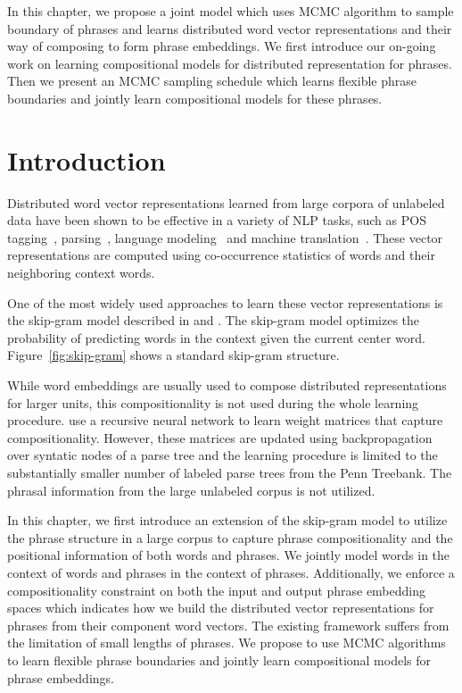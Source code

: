 In this chapter, we propose a joint model which uses MCMC algorithm to sample boundary of phrases and 
learns distributed word vector representations and their way of composing to form phrase embeddings.
We first introduce our on-going work on learning compositional models for distributed representation for phrases. Then we present an MCMC sampling schedule which learns flexible phrase  
boundaries and jointly learn compositional models for these phrases.
\section{Introduction}
Distributed word vector representations learned from large corpora of unlabeled data have been shown to be effective in
a variety of NLP tasks, such as POS tagging~\cite{collobert2011scratch}, parsing~\cite{chen2014fast,DurrettKlein2015}, 
language modeling~\cite{bengio2003neural,mnih2007three} and machine translation~\cite{devlin-EtAl:2014:P14-1,liu-EtAl:2014:P14-1,sutskever2014sequence,kalchbrenner2013recurrent}.
These vector representations are computed using co-occurrence statistics of words and their neighboring context words.


One of the most widely used approaches to learn these vector representations is the skip-gram model described in  and . 
The skip-gram model optimizes the probability of predicting words in the context given the current center word.  
Figure~\ref{fig:skip-gram} shows a standard skip-gram structure. 


While word embeddings are usually used to compose distributed representations for larger units,
this compositionality is not used during the whole learning procedure.  use a recursive neural network
to learn weight matrices that capture compositionality.
However, these matrices are updated using backpropagation over syntatic nodes of a parse tree and the
learning procedure is limited to the substantially 
smaller number of labeled parse trees from the Penn Treebank. The phrasal information from the large unlabeled corpus is not utilized.


In this chapter, we first introduce an extension of the skip-gram model to utilize the phrase structure in a large corpus to capture phrase compositionality and the positional information
of both words and phrases. We jointly model words in the context of words and
phrases in the context of phrases. Additionally, we enforce a compositionality constraint 
on both the input and output phrase embedding spaces which indicates how
we build the distributed vector representations for phrases from their component word vectors.
The existing framework suffers from the limitation of small lengths of phrases. We propose to use MCMC algorithms to learn flexible phrase boundaries
and jointly learn compositional models for phrase embeddings.
